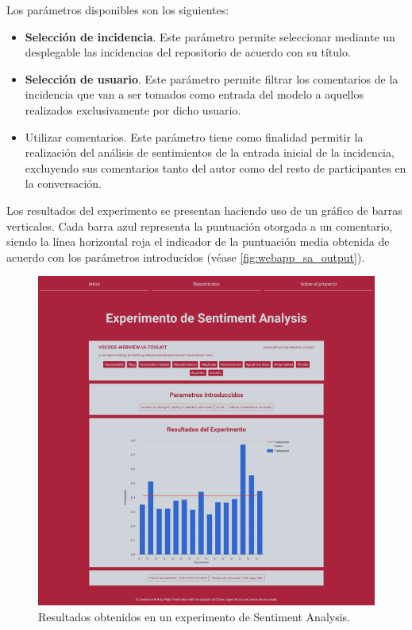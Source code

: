 Los parámetros disponibles son los siguientes:

\begin{itemize} \setlength\itemsep{0.2em}
    \item \textbf{Selección de incidencia}. Este parámetro permite seleccionar mediante un desplegable las incidencias del repositorio de acuerdo con su título. 
    \item \textbf{Selección de usuario}. Este parámetro permite filtrar los comentarios de la incidencia que van a ser tomados como entrada del modelo a aquellos realizados exclusivamente por dicho usuario.
    \item Utilizar comentarios. Este parámetro tiene como finalidad permitir la realización del análisis de sentimientos de la entrada inicial de la incidencia, excluyendo sus comentarios tanto del autor como del resto de participantes en la conversación.
\end{itemize}

Los resultados del experimento se presentan haciendo uso de un gráfico de barras verticales. Cada barra azul representa la puntuación otorgada a un comentario, siendo la línea horizontal roja el indicador de la puntuación media obtenida de acuerdo con los parámetros introducidos (véase \autoref{fig:webapp_sa_output}).

\begin{figure}[!ht]
	\centering
    \includegraphics[width=\textwidth]{img/webapp_sa_output.png}
	\caption{Resultados obtenidos en un experimento de Sentiment Analysis.}
	\label{fig:webapp_sa_output}
\end{figure}

